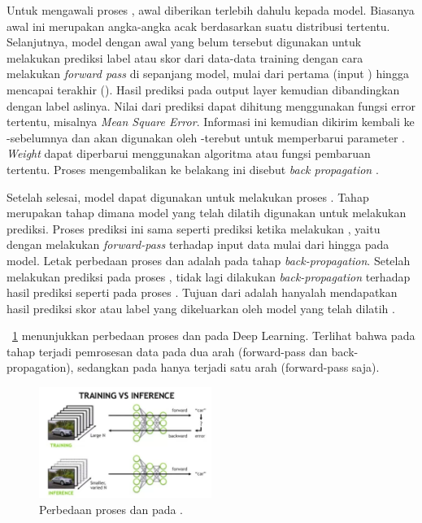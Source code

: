 Untuk mengawali proses \training, \weight awal diberikan terlebih dahulu kepada model. Biasanya \weight awal ini merupakan angka-angka acak berdasarkan suatu distribusi tertentu. Selanjutnya, model dengan \weight awal yang belum tersebut digunakan untuk melakukan prediksi label atau skor dari data-data training dengan cara melakukan \textit{forward pass} di sepanjang model, mulai dari \layer pertama (input \layer) hingga mencapai \layer terakhir (\outputa \layer). Hasil prediksi pada output layer kemudian dibandingkan dengan label aslinya. Nilai \error dari prediksi dapat dihitung menggunakan fungsi error tertentu, misalnya \textit{Mean Square Error}. Informasi \error ini kemudian dikirim kembali ke \layer-\layer sebelumnya dan akan digunakan oleh \layer-\layer terebut untuk memperbarui parameter \weight. \textit{Weight} dapat diperbarui menggunakan algoritma atau fungsi pembaruan \weight tertentu. Proses mengembalikan \error ke belakang ini disebut \textit{back propagation} \cite{trainvsinfer}. 

Setelah \training selesai, model \nn dapat digunakan untuk melakukan proses \inference. Tahap \inference merupakan tahap dimana model yang telah dilatih digunakan untuk melakukan prediksi. Proses prediksi ini sama seperti prediksi ketika melakukan \training, yaitu dengan melakukan \textit{forward-pass} terhadap input data mulai dari  \layer hingga \outputa \layer pada model. Letak perbedaan proses \inference dan \training adalah pada tahap \textit{back-propagation}. Setelah melakukan prediksi pada proses \inference, tidak lagi dilakukan \textit{back-propagation} terhadap \error hasil prediksi seperti pada proses \training. Tujuan dari \inference adalah hanyalah mendapatkan hasil prediksi skor atau label yang dikeluarkan oleh model yang telah dilatih \cite{trainvsinfer}. 

\pic~\ref{fig:trainvsinfer} menunjukkan perbedaan proses \training dan \inference pada Deep Learning. Terlihat bahwa pada tahap \training terjadi pemrosesan data pada dua arah (forward-pass dan back-propagation), sedangkan pada \inference hanya terjadi satu arah (forward-pass saja).

\begin{figure}
	\centering
	\includegraphics[width=0.50\textwidth]
	{pics/trainingvsinference.png}
	\caption{Perbedaan proses \training dan \inference pada \deeplearning.}
	\label{fig:trainvsinfer}
\end{figure}


